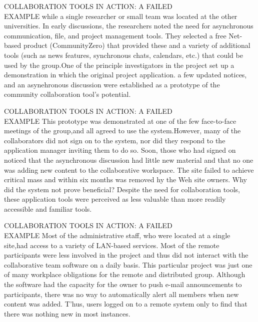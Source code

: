 \documentclass{beamer}
\begin{document}

\begin{frame}[t]{COLLABORATION TOOLS IN ACTION: A FAILED\\ EXAMPLE}
	while a single researcher or small team was located at the other universities. In early discussions, the researchers noted the need for asynchronous communication, file, and project management tools. They selected a free Net-based product (CommunityZero) that provided these and a variety of additional tools (such as news features, synchronous chats, calendars, etc.) that could be used by the group.One of the principle
	investigators in the project set up a demonstration in which the original project application. a few updated notices, and an asynehronous discussion were established as a prototype of the community collaboration tool's potential.
\end{frame}


\begin{frame}[t]{COLLABORATION TOOLS IN ACTION: A FAILED\\ EXAMPLE}
	  This prototype was demonstrated at one of the few face-to-face meetings of the group,and all agreed to use the system.However, many of the collaborators did not sign on to the system, nor did they respond to the application manager inviting them to do so. Soon, those who had signed on noticed that the asynchronous discussion had little new material and that no one was adding new content to the collaborative workspace. The site failed to achieve critical mass and within six months was removed hy the Weh site owners. Why did the system not prove beneficial? Despite the need for collaboration tools, these application tools were perceived as less valuable than more readily accessible and familiar tools.
\end{frame}


\begin{frame}[t]{COLLABORATION TOOLS IN ACTION: A FAILED\\ EXAMPLE}
	 Most of the administrative staff, who were located at a single site,had
	access to a variety of LAN-based services. Most of the remote participants were less involved in the project and thus did not interact with the collaborative team software on a daily basis. This particular project was just one of many workplace obligations for the
	remote and distributed group. Although the software had the capacity for the owner to
	push e-mail announcements to participants, there was no way to automatically alert all
	members when new content was added. T'hus, users logged on to a remote system only to
	find that there was nothing new in most instances.
\end{frame}
\end{document}
